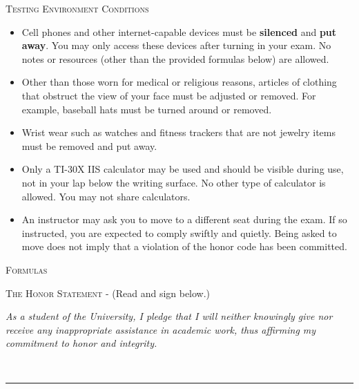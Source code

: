 \noindent \textsc{Testing Environment Conditions}
\begin{footnotesize}
\begin{itemize}
\item Cell phones and other internet-capable devices must be \textbf{silenced} and \textbf{put away}. You may only access these devices after turning in your exam. No notes or resources (other than the provided formulas below) are allowed.
\item Other than those worn for medical or religious reasons, articles of clothing that obstruct the view of your face must be adjusted or removed. For example, baseball hats must be turned around or removed.
\item Wrist wear such as watches and fitness trackers that are not jewelry items must be removed and put away.
\item Only a TI-30X IIS calculator may be used and should be visible during use, not in your lap below the writing surface. No other type of calculator is allowed. You may not share calculators.
\item An instructor may ask you to move to a different seat during the exam. If so instructed, you are expected to comply swiftly and quietly. Being asked to move does not imply that a violation of the honor code has been committed.\\
\end{itemize}
\end{footnotesize}

\noindent \textsc{Formulas}

\AllFormulas %

\vfill

\noindent \textsc{The Honor Statement} - (Read and sign below.)\\
\begin{footnotesize}
\textit{As a student of the University, I pledge that I will neither knowingly give nor receive any inappropriate assistance in academic work, thus affirming my commitment to honor and integrity.}\\
\end{footnotesize}

 \ \rule{8.75 cm}{.01cm}\\
